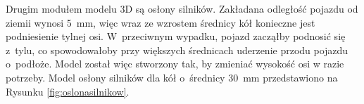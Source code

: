 Drugim modułem modelu 3D są osłony silników. Zakładana odległość pojazdu od ziemii wynosi 5~mm, więc wraz ze wzrostem średnicy kół konieczne jest podniesienie tylnej osi. W~przeciwnym wypadku, pojazd zacząłby podnosić się z~tylu, co spowodowałoby przy większych średnicach uderzenie przodu pojazdu o~podłoże. Model został więc stworzony tak, by zmieniać wysokość osi w razie potrzeby. Model osłony silników dla kół o~średnicy 30~mm przedstawiono na Rysunku \ref{fig:oslonasilnikow}.

\begin{figure}[!h]
    \centering
    \qquad
\end{figure}
